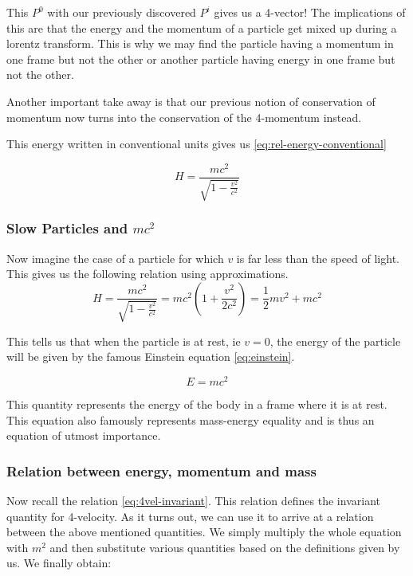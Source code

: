 \documentclass[12pt]{article}
\numberwithin{equation}{section}
\theoremstyle{plain}
\theoremstyle{definition}
\begin{document}
This $P^0$ with our previously discovered $P^i$ gives us a 4-vector! The implications of this are that the energy and the momentum of a particle get mixed up during a lorentz transform. This is why
we may find the particle having a momentum in one frame but not the other or another particle having energy in one frame but not the other. 

Another important take away is that our previous notion of conservation of momentum now turns into the conservation of the 4-momentum instead.

This energy written in conventional units gives us \eqref{eq:rel-energy-conventional}

\begin{equation}
    H = \frac{mc^2}{\sqrt{1-\frac{v^2}{c^2}}}
    \label{eq:rel-energy-conventional}
\end{equation}

\subsubsection*{Slow Particles and $mc^2$}

Now imagine the case of a particle for which $v$ is far less than the speed of light. This gives us the following relation using approximations.
\begin{equation}
    H = \frac{mc^2}{\sqrt{1-\frac{v^2}{c^2}}} = mc^2 \left(1 + \frac{v^2}{2c^2} \right) = \frac{1}{2} mv^2 + mc^2
    \label{eq:rel-energy-slow}
\end{equation}

This tells us that when the particle is at rest, ie $v=0$, the energy of the particle will be given by the famous Einstein equation \eqref{eq:einstein}.

\begin{equation}
    E = mc^2
    \label{eq:einstein}
\end{equation}

This quantity represents the energy of the body in a frame where it is at rest. This equation also famously represents mass-energy equality and is thus an equation of utmost importance.

\subsubsection*{Relation between energy, momentum and mass}

Now recall the relation \eqref{eq:4vel-invariant}. This relation defines the invariant quantity for 4-velocity. As it turns out, we can use it to arrive at a relation between the above mentioned quantities. We simply multiply the whole equation with $m^2$ and then substitute various quantities based on the definitions given by us. We finally obtain:
\end{document}
